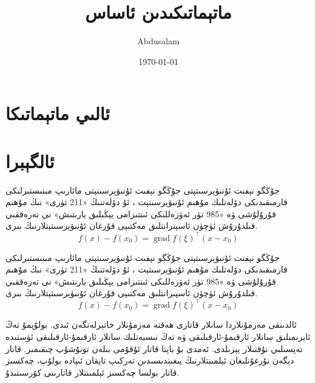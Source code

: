 \documentclass[a4paper,openany]{book}
\title{ماتېماتىكىدىن ئاساس}
\author{Abdusalam}
\date{\today}
\begin{document}
%

\newpage


\newpage
\setcounter{page}{1}
\part{ئالىي ماتېماتىكا}
\newcommand\yfx{$y=f(x)$}


\newpage

\newpage

\newpage

\newpage

\newpage

\newpage

\newpage

\part{ئالگېبرا}
\newpage

\newpage

\newpage

\newpage

\begin{WhiteRule}{جۇڭگو نېفىت ئۇنىۋېرسىتېتى}{}%
جۇڭگو نېفىت ئۇنىۋېرسىتېتى مائارىپ مىنىستىرلىكى قارمىقىدىكى دۆلەتلىك مۇھىم ئۇنىۋېرسىتېت ، ئۇ دۆلەتنىڭ «211 تۈرى» نىڭ مۇھىم قۇرۇلۇشى ۋە «985 تۈر ئەۋزەللىكى ئىنتىزامى يېڭىلىق يارىتىش» نى تەرەققىي قىلدۇرۇش ئۈچۈن ئاسپىرانتلىق مەكتىپى قۇرغان ئۇنىۋېرسىتېتلارنىڭ بىرى.
\begin{equation*}
f(x)-f(x_0) = \operatorname{grad} f(\xi)^{\top}(x-x_0)
\end{equation*}
\end{WhiteRule}\par\bigskip

\begin{MyTheorem}{جۇڭگو نېفىت ئۇنىۋېرسىتېتى}{}%
جۇڭگو نېفىت ئۇنىۋېرسىتېتى مائارىپ مىنىستىرلىكى قارمىقىدىكى دۆلەتلىك مۇھىم ئۇنىۋېرسىتېت ، ئۇ دۆلەتنىڭ «211 تۈرى» نىڭ مۇھىم قۇرۇلۇشى ۋە «985 تۈر ئەۋزەللىكى ئىنتىزامى يېڭىلىق يارىتىش» نى تەرەققىي قىلدۇرۇش ئۈچۈن ئاسپىرانتلىق مەكتىپى قۇرغان ئۇنىۋېرسىتېتلارنىڭ بىرى.
\begin{equation*}
f(x)-f(x_0) = \operatorname{grad} f(\xi)^{\top}(x-x_0)
\end{equation*}
\end{MyTheorem}

\newpage
\begin{note}
ئالدىنقى مەزمۇنلاردا سانلار قاتارى ھەقتە مەزمۇنلار خاتېرلەنگەن ئىدى. 
\textcolor{green}{}
بولۇپمۇ تەڭ ئايرىمىلىق   سانلار ئارقىمۇ-ئارقىلىقى ۋە تەڭ نىسبەتلىك سانلار ئارقىمۇ-ئارقىلىقى ئۈستىدە تەپسىلىي نۇقتىلار يېزىلدى. ئەمدى بۇ باپتا قاتار ئۇقۇمى بىلەن تونۇشۇپ چىقىمىز. قاتار دېگەن نۇرغۇنلىغان ئېلمىنتلارنىڭ يىغىندىسىدىن تەركىپ تاپقان ئىپادە بولۇپ، چەكسىز قاتار بولسا چەكسىز ئېلمىنتلار قاتارىنى كۆرسىتىدۇ.
\end{note}
\end{document}
